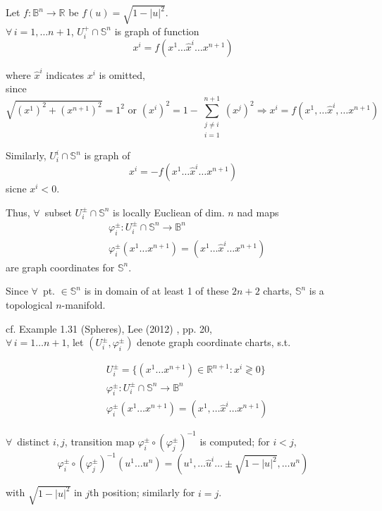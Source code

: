 Let $f: \mathbb{B}^n \to \mathbb{R}$ be $f(u) = \sqrt{ 1 - |u|^2}$. \\

$\forall \, i =1 , \dots n +1$, $U_i^+ \cap \mathbb{S}^n$ is graph of function
\[
x^i = f(x^1 \dots \widehat{x}^i \dots x^{n+1})
\]

where $\widehat{x}^i$ indicates $x^i$ is omitted, \\
since
\[
\sqrt{ (x^1)^2  + (x^{n+1})^2 } = 1^2 \text{ or } (x^i)^2 = 1 - \sum_{ \substack{ j\neq i \\ i =1} }^{n+1} (x^j)^2 \Longrightarrow x^i = f(x^1, \dots \widehat{x}^i, \dots x^{n+1})
\]

Similarly, $U_i^i \cap \mathbb{S}^n$ is graph of 
\[
x^i = -f(x^1 \dots \widehat{x}^i \dots x^{n+1})
\]
sicne $x^i < 0$.

Thus, $\forall \,$ subset $U_i^{\pm} \cap \mathbb{S}^n$ is locally Eucliean of dim. $n$ nad maps
\[
\begin{aligned}
	& \varphi_i^{\pm} : U_i^{\pm} \cap \mathbb{S}^n \to \mathbb{B}^n \\
	& \varphi_i^{\pm} (x^1 \dots x^{n+1}) = (x^1 \dots \widehat{x}^i \dots x^{n+1})
\end{aligned}
\]
are graph coordinates for $\mathbb{S}^n$.

Since $\forall \,$ pt. $\in \mathbb{S}^n$ is in domain of at least 1 of these $2n+2$ charts, $\mathbb{S}^n$ is a topological $n$-manifold.

cf. Example 1.31 (Spheres), Lee (2012) \cite{dgdt:JLee2012}, pp. 20, \\

$\forall \, i = 1 \dots n+1$, let $(U_i^{\pm}, \varphi_i^{\pm})$ denote graph coordinate charts, s.t.

\[
\begin{aligned}
	& U_i^{\pm} = \lbrace (x^1 \dots x^{n+1}) \in \mathbb{R}^{n+1} : x^i \gtrless 0 \rbrace \\ 
	& \varphi_i^{\pm} : U_i^{\pm} \cap \mathbb{S}^n \to \mathbb{B}^n \\ 
	& \varphi_i^{\pm} (x^1 \dots x^{n+1}) = (x^1, \dots \widehat{x}^i \dots x^{n+1})
\end{aligned}\]

$\forall \, $ distinct $i,j$, transition map $\varphi_i^{\pm} \circ (\varphi_j^{\pm})^{-1}$ is computed; for $i<j$,
\[
\varphi_i^{\pm} \circ (\varphi_j^{\pm})^{-1} (u^1 \dots u^n) = (u^1, \dots \widehat{u}^i \dots \pm \sqrt{1 - |u|^2}, \dots u^n )
\]

with $\sqrt{1- |u|^2}$ in $j$th position; similarly for $i =j$. \\

